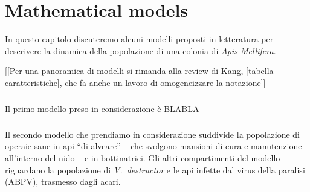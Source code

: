 \chapter{Mathematical models}
In questo capitolo discuteremo alcuni modelli proposti in letteratura per descrivere la dinamica della popolazione di una colonia di \emph{Apis Mellifera}.

[[Per una panoramica di modelli si rimanda alla review di Kang, [tabella caratteristiche], che fa anche un lavoro di omogeneizzare la notazione]]

\paragraph{}
Il primo modello preso in considerazione è \parencite{khoury2011} BLABLA

\paragraph{}
Il secondo modello che prendiamo in considerazione \parencite{ratti2017} suddivide la popolazione di operaie sane in api ``di alveare'' -- che svolgono mansioni di cura e manutenzione all'interno del nido -- e in bottinatrici.
Gli altri compartimenti del modello riguardano la popolazione di \emph{V.~destructor} e le api infette dal virus della paralisi (ABPV), trasmesso dagli acari.




